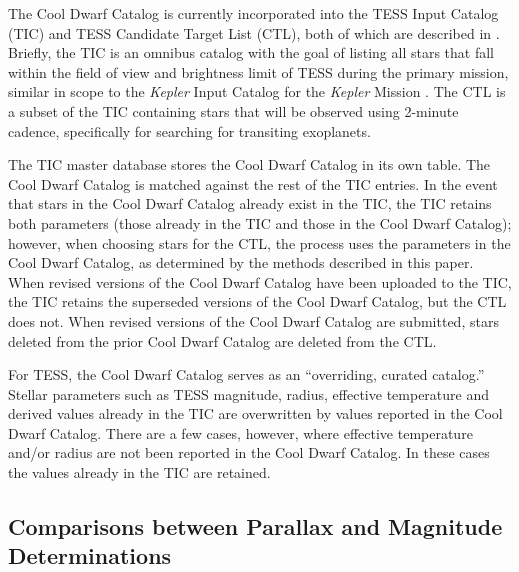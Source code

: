 \documentclass[twocolumn]{aastex62}
\begin{document}
The Cool Dwarf Catalog is currently incorporated into the TESS Input Catalog (TIC) and TESS Candidate Target List (CTL), both of which are described in \citet[][]{Stassun2017}.  Briefly, the TIC is an omnibus catalog with the goal of listing all stars that fall within the field of view and brightness limit of TESS during the primary mission, similar in scope to the {\it Kepler} Input Catalog for the {\it Kepler} Mission \citep[][]{Batalha2010, Brown2011}.  The CTL is a subset of the TIC containing stars that will be observed using 2-minute cadence, specifically for searching for transiting exoplanets.  

The TIC master database stores the Cool Dwarf Catalog in its own table.  The Cool Dwarf Catalog is matched against the rest of the TIC entries.  In the event that stars in the Cool Dwarf Catalog already exist in the TIC, the TIC retains both parameters (those already in the TIC and those in the Cool Dwarf Catalog); however, when choosing stars for the CTL, the process uses the parameters in the Cool Dwarf Catalog, as determined by the methods described in this paper.  When revised versions of the Cool Dwarf Catalog have been uploaded to the TIC, the TIC retains the superseded versions of the Cool Dwarf Catalog, but the CTL does not.  When revised versions of the Cool Dwarf Catalog are submitted, stars deleted from the prior Cool Dwarf Catalog are deleted from the CTL.


For TESS, the Cool Dwarf Catalog serves as an ``overriding, curated catalog.'' Stellar parameters such as TESS magnitude, radius, effective temperature and derived values already in the TIC are overwritten by values reported in the Cool Dwarf Catalog. There are a few cases, however, where effective temperature and/or radius are not been reported in the Cool Dwarf Catalog. In these cases the values already in the TIC are retained.


\subsection{Comparisons between Parallax and Magnitude Determinations}
\end{document}
